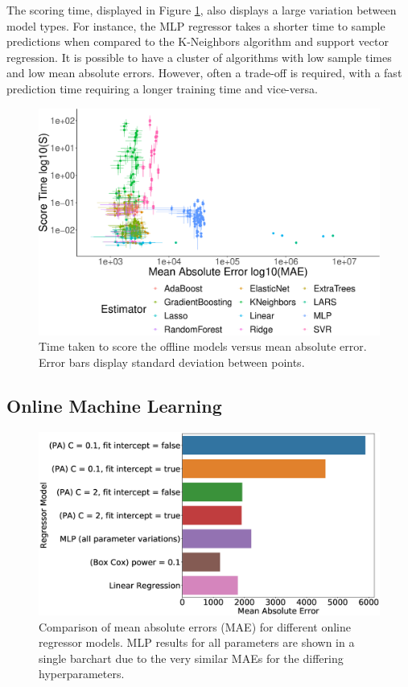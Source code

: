 \documentclass[final,3p,times,twocolumn,numbers]{elsarticle}
\begin{document}
The scoring time, displayed in Figure \ref{fig:offline_score_time_vs_mae}, also displays a large variation between model types. For instance, the MLP regressor takes a shorter time to sample predictions when compared to the K-Neighbors algorithm and support vector regression. It is possible to have a cluster of algorithms with low sample times and low mean absolute errors. However, often a trade-off is required, with a fast prediction time requiring a longer training time and vice-versa. 



\begin{figure}[h]
\centering
\includegraphics[width=\columnwidth]{figures/results/offline_score_time_vs_mae_all_results_opaque.eps}
\caption{Time taken to score the offline models versus mean absolute error. Error bars display standard deviation between points.}
\label{fig:offline_score_time_vs_mae}
\end{figure}









\subsection{Online Machine Learning}

\begin{figure}[h]
\centering
\includegraphics[width=0.8\columnwidth,natwidth=1300,natheight=750]{figures/results/online_model_mae_barplot.eps}
\caption{Comparison of mean absolute errors (MAE) for different online regressor models. MLP results for all parameters are shown in a single barchart due to the very similar MAEs for the differing hyperparameters.}
\label{fig:online_model_mae_barplot}
\end{figure}
\end{document}
